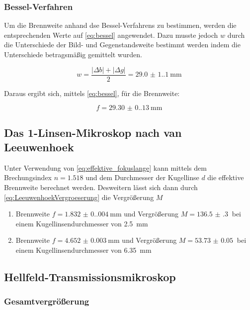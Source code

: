 \documentclass[12pt,english,ngerman]{scrartcl}
\begin{document}
\subsubsection{Bessel-Verfahren}

Um die Brennweite anhand dse Bessel-Verfahrens zu bestimmen, werden die
entsprechenden Werte auf \autoref{eq:bessel} angewendet. Dazu musste jedoch $w$
durch die Unterschiede der Bild- und Gegenstandsweite bestimmt werden indem die
Unterschiede betragsmäßig gemittelt wurden.

\begin{equation}
	w = \frac{|\Delta b|+|\Delta g|}{2} = \SI{29.0(1.1)}{\mm}
\end{equation}

Daraus ergibt sich, mittels \autoref{eq:bessel}, für die Brennweite:

\begin{equation}
	f =  \SI{29.30(0.13)}{\mm}
\end{equation}

\subsection{Das 1-Linsen-Mikroskop nach van Leeuwenhoek}
Unter Verwendung von \autoref{eq:effektive_fokuslange} kann mittels dem
Brechungsindex $n=\num{1.518}$ und dem Durchmesser der Kugellinse $d$ die
effektive Brennweite berechnet werden. Desweitern lässt sich dann durch
\autoref{eq:LeeuwenhoekVergroeserung} die Vergrößerung $M$

\begin{enumerate}
	\item Brennweite $f=\SI{1.832(0.004)}{\mm}$ und Vergrößerung $M=\SI{136.5(3)}{}$ bei
	      einem Kugellinsendurchmesser von \SI{2.5}{\mm}
	\item Brennweite $f=\SI{4.652(3)}{\mm}$ und Vergrößerung $M=\SI{53.73(5)}{}$ bei
	      einem Kugellinsendurchmesser von \SI{6.35}{\mm}
\end{enumerate}

\subsection{Hellfeld-Transmissionsmikroskop}

\subsubsection{Gesamtvergrößerung}
\end{document}
